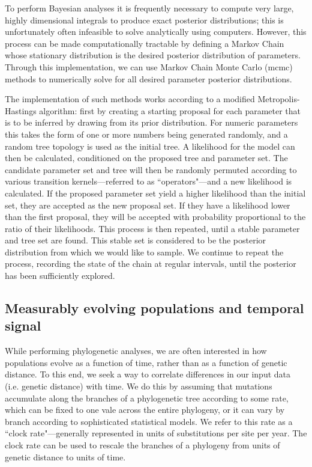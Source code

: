 To perform Bayesian analyses it is frequently necessary to compute very large, highly dimensional integrals to produce exact posterior distributions; this is unfortunately often infeasible to solve analytically using computers.
However, this process can be made computationally tractable by defining a Markov Chain whose stationary distribution is the desired posterior distribution of parameters.
Through this implementation, we can use Markov Chain Monte Carlo (\gls{mcmc}) methods to numerically solve for all desired parameter posterior distributions.

The implementation of such methods works according to a modified Metropolis-Hastings algorithm: first by creating a starting proposal for each parameter that is to be inferred by drawing from its prior distribution.
For numeric parameters this takes the form of one or more numbers being generated randomly, and a random tree topology is used as the initial tree.
A likelihood for the model can then be calculated, conditioned on the proposed tree and parameter set.
The candidate parameter set and tree will then be randomly permuted according to various transition kernels---referred to as ``operators"---and a new likelihood is calculated.
If the proposed parameter set yield a higher likelihood than the initial set, they are accepted as the new proposal set.
If they have a likelihood lower than the first proposal, they will be accepted with probability proportional to the ratio of their likelihoods.
This process is then repeated, until a stable parameter and tree set are found.
This stable set is considered to be the posterior distribution from which we would like to sample.
We continue to repeat the process, recording the state of the chain at regular intervals, until the posterior has been sufficiently explored.

\subsection{Measurably evolving populations and temporal signal}

While performing phylogenetic analyses, we are often interested in how populations evolve as a function of time, rather than as a function of genetic distance.
To this end, we seek a way to correlate differences in our input data (i.e. genetic distance) with time.
We do this by assuming that mutations accumulate along the branches of a phylogenetic tree according to some rate, which can be fixed to one vale across the entire phylogeny\cite{strictClockPaper}, or it can vary by branch according to sophisticated statistical models\cite{unocrrelatedRelaxedClocks, randomLocalClocks}.
We refer to this rate as a ``clock rate"---generally represented in units of substitutions per site per year.
The clock rate can be used to rescale the branches of a phylogeny from units of genetic distance to units of time.

